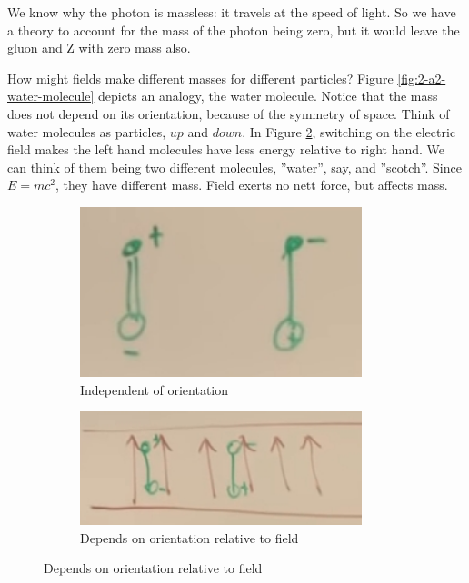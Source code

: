 \documentclass[]{article}
\begin{document}
We know why the photon is massless: it travels at the speed of light. So we have a theory to account for the mass of the photon being zero, but it would leave the gluon and Z with zero mass also.

How might fields make different masses for different particles? Figure \ref{fig:2-a2-water-molecule} depicts an analogy, the water molecule. Notice that the mass does not depend on its orientation, because of the symmetry of space. Think of water molecules as particles, $up$ and $down$. In Figure \ref{fig:2-a2-water-molecule-in-field}, switching on the electric field makes the left hand molecules have less energy relative to right hand. We can think of them being two different molecules, ''water'', say, and ''scotch''. Since $E=mc^2$, they have different mass. Field exerts no nett force, but affects mass.  

\begin{figure}[H]
	\begin{center}
		\caption{Analogy: the water molecule and its mass}\label{fig:2-a2-water-molecule}
		\begin{subfigure}[t]{0.4\textwidth}
			\caption{Independent of orientation}
			\includegraphics[width=0.9\textwidth]{2-a2-water-molecule}
		\end{subfigure}
		\begin{subfigure}[t]{0.4\textwidth}
			\caption{Depends on orientation relative to field}\label{fig:2-a2-water-molecule-in-field}
			\includegraphics[width=0.9\textwidth]{2-a2-water-molecule-in-field}
		\end{subfigure}

	\end{center}
\end{figure}
\end{document}
